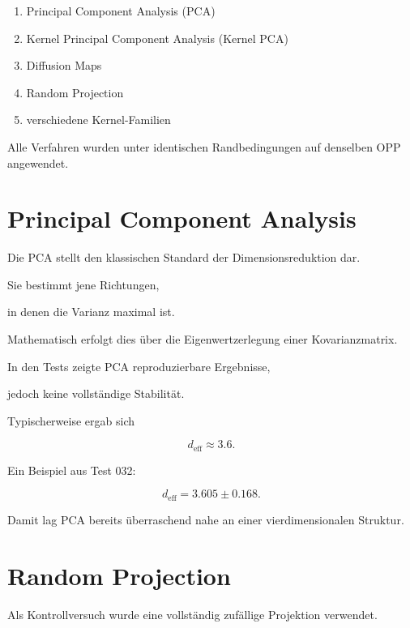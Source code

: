 \begin{enumerate}

\item
Principal Component Analysis (PCA)

\item
Kernel Principal Component Analysis (Kernel PCA)

\item
Diffusion Maps

\item
Random Projection

\item
verschiedene Kernel-Familien

\end{enumerate}

Alle Verfahren wurden unter identischen Randbedingungen auf denselben OPP angewendet.


\section*{Principal Component Analysis}

Die PCA stellt den klassischen Standard der Dimensionsreduktion dar.

Sie bestimmt jene Richtungen,

in denen die Varianz maximal ist.

Mathematisch erfolgt dies über die Eigenwertzerlegung einer Kovarianzmatrix.

In den Tests zeigte PCA reproduzierbare Ergebnisse,

jedoch keine vollständige Stabilität.

Typischerweise ergab sich

\[
d_{\mathrm{eff}}
\approx
3.6.
\]

Ein Beispiel aus Test 032:

\[
d_{\mathrm{eff}}
=
3.605
\pm
0.168.
\]

Damit lag PCA bereits überraschend nahe an einer vierdimensionalen Struktur.


\section*{Random Projection}

Als Kontrollversuch wurde eine vollständig zufällige Projektion verwendet.

